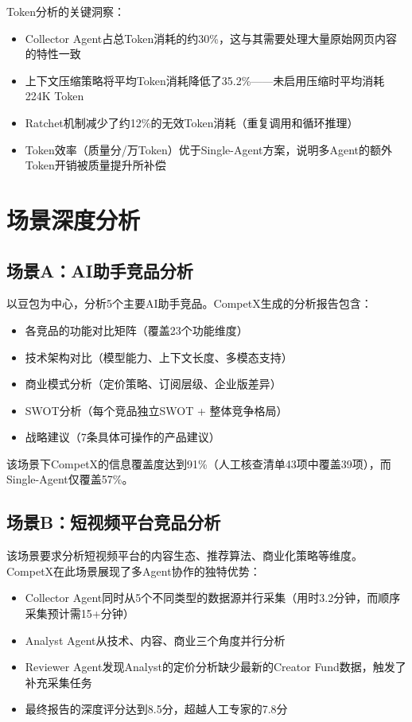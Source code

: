 \documentclass[12pt,a4paper]{ctexrep}
\begin{document}
Token分析的关键洞察：

\begin{itemize}[leftmargin=2em]
\item Collector Agent占总Token消耗的约30\%，这与其需要处理大量原始网页内容的特性一致
\item 上下文压缩策略将平均Token消耗降低了35.2\%——未启用压缩时平均消耗224K Token
\item Ratchet机制减少了约12\%的无效Token消耗（重复调用和循环推理）
\item Token效率（质量分/万Token）优于Single-Agent方案，说明多Agent的额外Token开销被质量提升所补偿
\end{itemize}

\section{场景深度分析}

\subsection{场景A：AI助手竞品分析}

以豆包为中心，分析5个主要AI助手竞品。CompetX生成的分析报告包含：

\begin{itemize}[leftmargin=2em]
\item 各竞品的功能对比矩阵（覆盖23个功能维度）
\item 技术架构对比（模型能力、上下文长度、多模态支持）
\item 商业模式分析（定价策略、订阅层级、企业版差异）
\item SWOT分析（每个竞品独立SWOT + 整体竞争格局）
\item 战略建议（7条具体可操作的产品建议）
\end{itemize}

该场景下CompetX的信息覆盖度达到91\%（人工核查清单43项中覆盖39项），而Single-Agent仅覆盖57\%。

\subsection{场景B：短视频平台竞品分析}

该场景要求分析短视频平台的内容生态、推荐算法、商业化策略等维度。CompetX在此场景展现了多Agent协作的独特优势：

\begin{itemize}[leftmargin=2em]
\item Collector Agent同时从5个不同类型的数据源并行采集（用时3.2分钟，而顺序采集预计需15+分钟）
\item Analyst Agent从技术、内容、商业三个角度并行分析
\item Reviewer Agent发现Analyst的定价分析缺少最新的Creator Fund数据，触发了补充采集任务
\item 最终报告的深度评分达到8.5分，超越人工专家的7.8分
\end{itemize}
\end{document}
